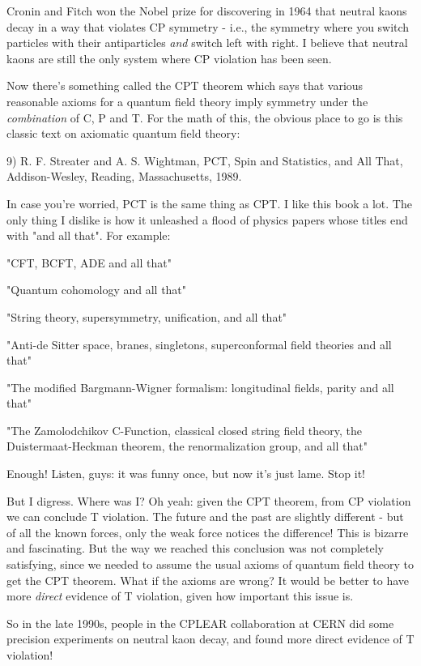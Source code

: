 Cronin and Fitch won the Nobel prize for discovering in 1964 that 
neutral kaons decay in a way that violates CP symmetry - i.e., the 
symmetry where you switch particles with their antiparticles \emph{and} 
switch left with right.  I believe that neutral kaons are still the 
only system where CP violation has been seen.  

Now there's something called the CPT theorem which says that various
reasonable axioms for a quantum field theory imply symmetry under the
\emph{combination} of C, P and T.  For the math of this, the obvious place
to go is this classic text on axiomatic quantum field theory:

9) R. F. Streater and A. S. Wightman, PCT, Spin and Statistics, and
All That, Addison-Wesley, Reading, Massachusetts, 1989.

In case you're worried, PCT is the same thing as CPT.  I like this
book a lot.  The only thing I dislike is how it unleashed a flood of 
physics papers whose titles end with "and all that".  For example:

"CFT, BCFT, ADE and all that"

"Quantum cohomology and all that"

"String theory, supersymmetry, unification, and all that"

"Anti-de Sitter space, branes, singletons, superconformal field theories 
and all that" 

"The modified Bargmann-Wigner formalism: longitudinal fields, parity and 
all that"

"The Zamolodchikov C-Function, classical closed string field theory, the 
Duistermaat-Heckman theorem, the renormalization group, and all that"

Enough!  Listen, guys: it was funny once, but now it's just lame.  Stop it!

But I digress.  Where was I?   Oh yeah: given the CPT theorem, from 
CP violation we can conclude T violation.  The future and the past 
are slightly different - but of all the known forces, only the weak 
force notices the difference!  This is bizarre and fascinating.  But 
the way we reached this conclusion was not completely satisfying, since 
we needed to assume the usual axioms of quantum field theory to get the 
CPT theorem.  What if the axioms are wrong?  It would be better to have 
more \emph{direct} evidence of T violation, given how important this issue is.  

So in the late 1990s, people in the CPLEAR collaboration at CERN did 
some precision experiments on neutral kaon decay, and found more direct
evidence of T violation!

